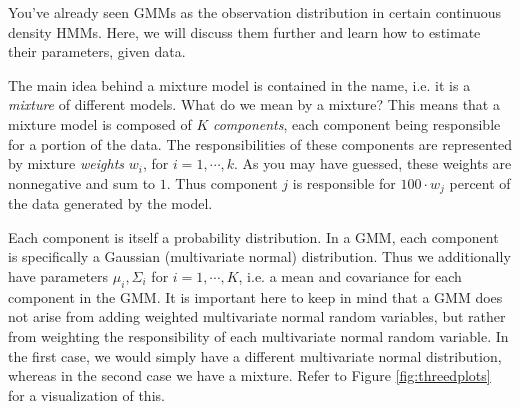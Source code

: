 
You've already seen GMMs as the observation distribution in certain continuous density HMMs. Here, we will discuss them further and learn how to estimate their parameters, given data.

The main idea behind a mixture model is contained in the name, i.e. it is a \emph{mixture} of different models. What do we mean by a mixture? This means that a mixture model is composed of $K$ \emph{components}, each component being responsible for a portion of the data. The responsibilities of these components are represented by mixture \emph{weights} $w_{i}$, for $i = 1, \cdots, k$. As you may have guessed, these weights are nonnegative and sum to $1$. Thus component $j$ is responsible for $100\cdot w_{j}$ percent of the data generated by the model.

Each component is itself a probability distribution. In a GMM, each component is specifically a Gaussian (multivariate normal) distribution. Thus we additionally have parameters $\mu_{i}, \Sigma_{i}$ for $i = 1, \cdots, K$, i.e. a mean and covariance for each component in the GMM. It is important here to keep in mind that a GMM does not arise from adding weighted multivariate normal random variables, but rather from weighting the responsibility of each multivariate normal random variable. In the first case, we would simply have a different multivariate normal distribution, whereas in the second case we have a mixture. Refer to Figure \ref{fig:threedplots} for a visualization of this.

